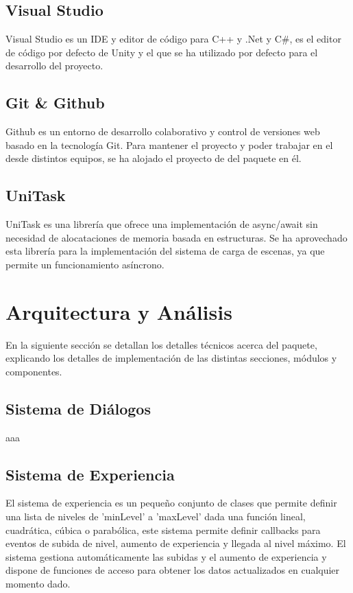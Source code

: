 \subsection{Visual Studio}

Visual Studio\cite{visualstudio} es un IDE y editor de código para C++ y .Net y C\#, es el editor de código por defecto de Unity y el que se ha utilizado por defecto para el desarrollo del proyecto. 

\subsection{Git \& Github}

Github\cite{github} es un entorno de desarrollo colaborativo y control de versiones web basado en la tecnología Git. Para mantener el proyecto y poder trabajar en el desde distintos equipos, se ha alojado el proyecto de del paquete\cite{Repo} en él.

\subsection{UniTask}

UniTask\cite{UniTask} es una librería que ofrece una implementación de async/await sin necesidad de alocataciones de memoria basada en estructuras. Se ha aprovechado esta librería para la implementación del sistema de carga de escenas, ya que permite un funcionamiento asíncrono.

\section{Arquitectura y Análisis}
En la siguiente sección se detallan los detalles técnicos acerca del paquete, explicando los detalles de implementación de las distintas secciones, módulos y componentes.

\subsection{Sistema de Diálogos}
aaa

\subsection{Sistema de Experiencia}
El sistema de experiencia es un pequeño conjunto de clases que permite definir una lista de niveles de 'minLevel' a 'maxLevel' dada una función lineal, cuadrática, cúbica o 
 parabólica, este sistema permite definir callbacks para eventos de subida de nivel, aumento de experiencia y llegada al nivel máximo. El sistema gestiona automáticamente las
 subidas y el aumento de experiencia y dispone de funciones de acceso para obtener los datos actualizados en cualquier momento dado.


